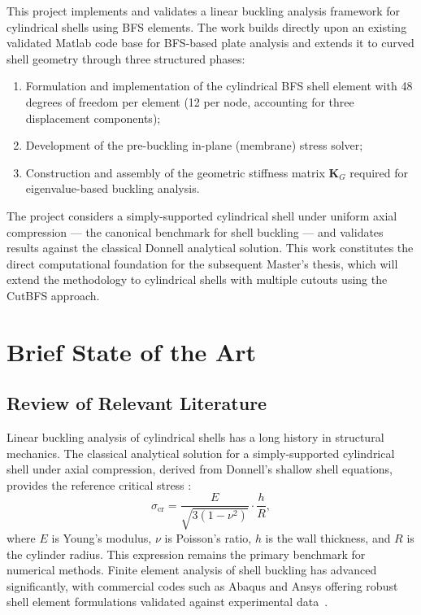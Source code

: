 \documentclass[9pt,a4paper,twoside]{tau-class/tau}
\begin{document}
This project implements and validates a linear buckling analysis framework
for cylindrical shells using BFS elements. The work builds directly upon an
existing validated Matlab code base for BFS-based plate analysis
\cite{eisentraeger2022} and extends it to curved shell geometry through
three structured phases:
%
\begin{enumerate}
    \item Formulation and implementation of the cylindrical BFS shell element
          with 48 degrees of freedom per element (12 per node, accounting for
          three displacement components);
    \item Development of the pre-buckling in-plane (membrane) stress solver;
    \item Construction and assembly of the geometric stiffness matrix
          $\mathbf{K}_G$ required for eigenvalue-based buckling analysis.
\end{enumerate}
%
The project considers a simply-supported cylindrical shell under uniform
axial compression --- the canonical benchmark for shell buckling --- and
validates results against the classical Donnell analytical solution. This
work constitutes the direct computational foundation for the subsequent
Master's thesis, which will extend the methodology to cylindrical shells
with multiple cutouts using the CutBFS approach.

\section{Brief State of the Art}

\subsection{Review of Relevant Literature}

Linear buckling analysis of cylindrical shells has a long history in
structural mechanics. The classical analytical solution for a
simply-supported cylindrical shell under axial compression, derived from
Donnell's shallow shell equations, provides the reference critical stress
\cite{timoshenko1961}:
%
\begin{equation}
    \sigma_{\mathrm{cr}} 
    = \frac{E}{\sqrt{3\left(1-\nu^2\right)}} \cdot \frac{h}{R},
    \label{eq:donnell}
\end{equation}
%
where $E$ is Young's modulus, $\nu$ is Poisson's ratio, $h$ is the wall
thickness, and $R$ is the cylinder radius. This expression remains the
primary benchmark for numerical methods. Finite element analysis of shell
buckling has advanced significantly, with commercial codes such as Abaqus and
Ansys offering robust shell element formulations validated against
experimental data~\cite{abaqus2009}.
\end{document}
